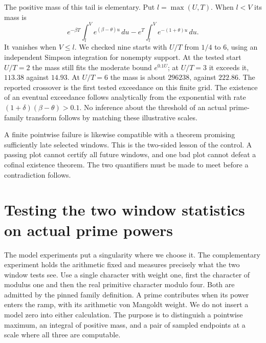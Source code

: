 \documentclass[12pt,letterpaper]{article}
\begin{document}
The positive mass of this tail is elementary. Put \(l=\max(U,T)\). When \(l<V\) its mass is
\[
        e^{-\beta T}\int_l^V e^{(\beta-\theta)u}\,du
             -e^{T}\int_l^V e^{-(1+\theta)u}\,du .
\]
It vanishes when \(V\le l\). We checked nine starts with \(U/T\) from \(1/4\) to 6, using an independent Simpson integration for nonempty support. At the tested start \(U/T=2\) the mass still fits the moderate bound \(e^{0.1U}\); at \(U/T=3\) it exceeds it, \(113.38\) against \(14.93\). At \(U/T=6\) the mass is about \(296238\), against \(222.86\). The reported crossover is the first tested exceedance on this finite grid. The existence of an eventual exceedance follows analytically from the exponential with rate \((1+\delta)(\beta-\theta)>0.1\). No inference about the threshold of an actual prime-family transform follows by matching these illustrative scales.

A finite pointwise failure is likewise compatible with a theorem promising sufficiently late selected windows. This is the two-sided lesson of the control. A passing plot cannot certify all future windows, and one bad plot cannot defeat a cofinal existence theorem. The two quantifiers must be made to meet before a contradiction follows.



\section{Testing the two window statistics on actual prime powers}
\label{sec:actual-prime-mass}

The model experiments put a singularity where we choose it. The complementary experiment holds the arithmetic fixed and measures precisely what the two window tests see. Use a single character with weight one, first the character of modulus one and then the real primitive character modulo four. Both are admitted by the pinned family definition. A prime contributes when its power enters the ramp, with its arithmetic von Mangoldt weight. We do not insert a model zero into either calculation. The purpose is to distinguish a pointwise maximum, an integral of positive mass, and a pair of sampled endpoints at a scale where all three are computable.
\end{document}
